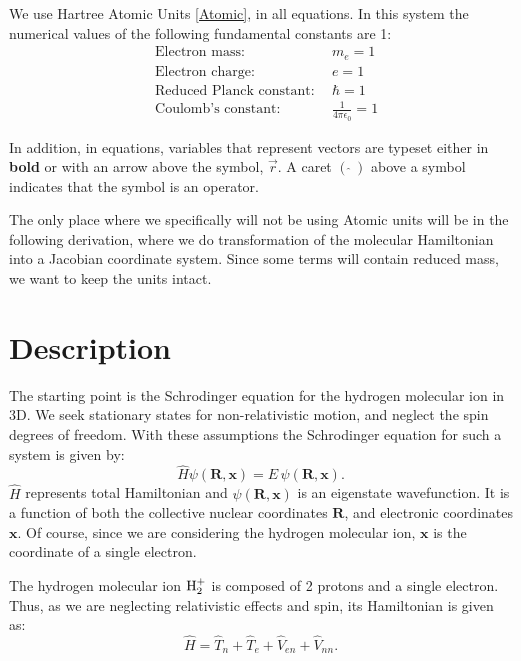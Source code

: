 We use Hartree Atomic Units \eqref{Atomic}, in all equations. In this system the numerical values of the following fundamental constants are 1:
\setlength{\mathindent}{0pt}
\begin{equation}\label{Atomic}
\begin{split}
    & \text{Electron mass:}\ &\ m_e = 1 \\ 
    & \text{Electron charge:}\ &\ e = 1 \\
    & \text{Reduced Planck constant:}\ &\ \hbar = 1 \\
    & \text{Coulomb's constant:}\ &\ \frac{1}{4\pi\epsilon_0} = 1
\end{split}
\end{equation}

In addition, in equations, variables that represent vectors are typeset either in \textbf{bold} or with an arrow above the symbol, $ \vec{r} $. A caret $(\,\hat{}\ ) $  above a symbol indicates that the symbol is an operator.

The only place where we specifically will not be using Atomic units will be in the following derivation, where we do transformation of the molecular Hamiltonian into a Jacobian coordinate system. Since some terms will contain reduced mass, we want to keep the units intact.

\section{Description}
The starting point is the Schrodinger equation for the hydrogen molecular ion in 3D. We 
seek stationary states for non-relativistic motion, and neglect the spin degrees of freedom. With these assumptions the Schrodinger equation for such a system is given by:
\begin{equation}\label{sch1}
\hat{H}\psi\left(\mathbf{R},\mathbf{x}\right) = E\,\psi\left(\mathbf{R},\mathbf{x}\right).
\end{equation}
$ \hat{H} $ represents total Hamiltonian and $ \psi\left(\mathbf{R},\mathbf{x}\right) $ is an eigenstate wavefunction. It is a function of both the collective nuclear coordinates $ \mathbf{R} $,  and electronic coordinates $\mathbf{x} $. Of course, since we are considering the hydrogen molecular ion, $\mathbf{x} $ is the coordinate of a single electron.

The hydrogen molecular ion $ {\rm H}_2^{+} $ is composed of 2 protons and a single electron. Thus, as we are neglecting relativistic effects and spin, its Hamiltonian is given as:
\begin{equation}\label{hh}
\hat{H} = \hat{T}_n + \hat{T}_e + \hat{V}_{en} + \hat{V}_{nn}. 
\end{equation}


